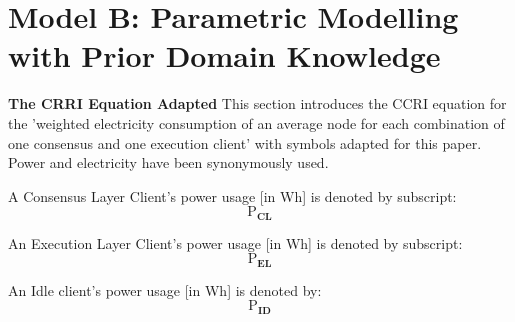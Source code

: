 \section{Model B: Parametric Modelling with Prior Domain Knowledge}



\textbf{The CRRI Equation Adapted}
This section introduces the CCRI equation for the 'weighted  electricity  consumption  of  an  average  node for each combination of one consensus and one execution client'\cite{CryptoCarbonRatingsInstitute2022TheNetwork} with symbols adapted for this paper. Power and electricity have been synonymously used. 

A Consensus Layer Client's power usage [in Wh] is denoted by subscript:
\begin{equation*}
    \boldsymbol{\mathrm{P}_{CL}}
\end{equation*}

An Execution Layer Client's power usage [in Wh] is denoted by subscript:
\begin{equation*}
    \boldsymbol{\mathrm{P}_{EL}}
\end{equation*}
 
 An Idle client's power usage [in Wh] is denoted by: \begin{equation*}
    \boldsymbol{\mathrm{P}_{ID}}
\end{equation*} 

